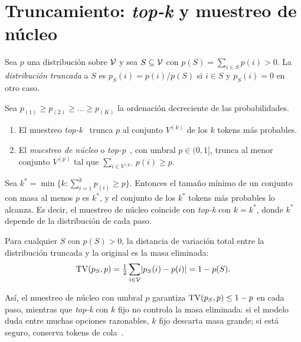 \section{Truncamiento: \emph{top-k} y muestreo de núcleo}

\begin{definicion}\label{def:truncada}
Sea $p$ una distribución sobre $\mathcal{V}$ y sea $S\subseteq\mathcal{V}$ con $p(S)=\sum_{i\in S}p(i)>0$. La \emph{distribución truncada} a $S$ es $p_S(i)=p(i)/p(S)$ si $i\in S$ y $p_S(i)=0$ en otro caso.
\end{definicion}

\begin{definicion}\label{def:topk-topp}
Sea $p_{(1)}\ge p_{(2)}\ge\dots\ge p_{(K)}$ la ordenación decreciente de las probabilidades.
\begin{enumerate}[label=(\alph*)]
  \item El muestreo \emph{top-k}~\cite[§5.4]{fan} trunca $p$ al conjunto $V^{(k)}$ de los $k$ tokens más probables.
  \item El \emph{muestreo de núcleo} o \emph{top-p}~\cite[§3.1]{holtzman}, con umbral $p\in(0,1]$, trunca al menor conjunto $V^{(p)}$ tal que $\sum_{i\in V^{(p)}}p(i)\ge p$.
\end{enumerate}
\end{definicion}

\begin{proposicion}\label{prop:nucleo}
Sea $k^{\ast}=\min\{k:\sum_{i=1}^{k}p_{(i)}\ge p\}$. Entonces el tamaño mínimo de un conjunto con masa al menos $p$ es $k^{\ast}$, y el conjunto de los $k^{\ast}$ tokens más probables lo alcanza. Es decir, el muestreo de núcleo coincide con \emph{top-k} con $k=k^{\ast}$, donde $k^{\ast}$ depende de la distribución de cada paso.
\end{proposicion}

\begin{proposicion}\label{prop:tv-truncada}
Para cualquier $S$ con $p(S)>0$, la distancia de variación total entre la distribución truncada y la original es la masa eliminada:
\[
\operatorname{TV}(p_S,p)=\tfrac12\sum_{i\in\mathcal{V}}\lvert p_S(i)-p(i)\rvert=1-p(S).
\]
\end{proposicion}

Así, el muestreo de núcleo con umbral $p$ garantiza $\operatorname{TV}(p_S,p)\le 1-p$ en cada paso, mientras que \emph{top-k} con $k$ fijo no controla la masa eliminada: si el modelo duda entre muchas opciones razonables, $k$ fijo descarta masa grande; si está seguro, conserva tokens de cola~\cite[§3.2]{holtzman}.

